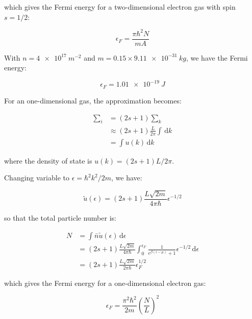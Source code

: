 \documentclass[12pt]{article}
\begin{document}
which gives the Fermi energy for a two-dimensional electron gas with spin $s = 1/2$:

\begin{equation}
    \epsilon_{F} = \frac{\pi\hbar^{2} N}{m A}
\end{equation}

With $n = \qty{4e17}{m^{-2}}$ and $m = 0.15 \times \qty{9.11e-31}{kg}$, we have the Fermi energy:

\begin{equation}
    \epsilon_{F} = \qty{1.01e-19}{J}
\end{equation}

For an one-dimensional gas, the approximation becomes:

\begin{equation}
    \begin{split}
        \sum_{i} &= (2s + 1) \sum_{k} \\
        &\approx (2s + 1) \frac{L}{2\pi} \int \, \mathrm{d}k \\
        &= \int u(k) \, \mathrm{d}k
    \end{split}
\end{equation}

where the density of state is $u(k) = (2s + 1) L / 2\pi$.

Changing variable to $\epsilon = \hbar^{2} k^{2}/2m$, we have:

\begin{equation}
    \tilde{u}(\epsilon) = (2s + 1) \frac{L \sqrt{2m}}{4\pi \hbar} \epsilon^{-1/2}
\end{equation}

so that the total particle number is:

\begin{equation}
    \begin{split}
        N &= \int \bar{n} \tilde{u}(\epsilon) \, \mathrm{d}\epsilon \\
        &= (2s + 1) \frac{L \sqrt{2m}}{4\pi \hbar} \int_{0}^{\epsilon_{F}} \frac{1}{e^{\beta (\epsilon - \mu)} + 1} \epsilon^{-1/2} \, \mathrm{d}\epsilon \\
        &= (2s + 1) \frac{L \sqrt{2m}}{2\pi \hbar} \epsilon_{F}^{1/2}
    \end{split}
\end{equation}

which gives the Fermi energy for a one-dimensional electron gas:

\begin{equation}
    \epsilon_{F} = \frac{\pi^{2} \hbar^{2} }{2m} \left( \frac{N}{L} \right)^{2}
\end{equation}
\end{document}
